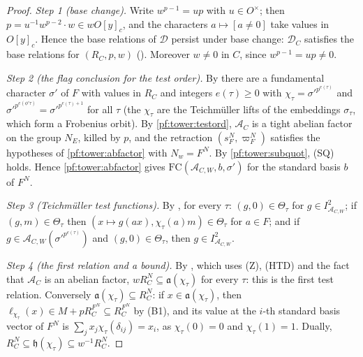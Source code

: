 \begin{proof}
\emph{Step 1 (base change).} Write $w^{p-1}=up$ with $u\in O^\times$; then $p=u^{-1}w^{p-2}\cdot w\in wO[y]_c$, and the
characters $a\mapsto[a\ne0]$ take values in $O[y]_c$. Hence the base relations of $\mathcal D$ persist under base change:
$\mathcal D_C$ satisfies the base relations for $(R_C,p,w)$
(). Moreover $w\ne0$ in $C$, since $w^{p-1}=up\ne0$.

\emph{Step 2 (the flag conclusion for the test order).} By
 there are a fundamental character $\sigma'$ of $F$ with values in
$R_C$ and integers $e(\tau)\ge0$ with $\chi_\tau=\sigma'^{p^{e(\tau)}}$ and $\sigma'^{p^{e(\phi'\tau)}}=\sigma'^{p^{e(\tau)+1}}$
for all $\tau$ (the $\chi_\tau$ are the Teichm\"uller lifts of the embeddings $\sigma_\tau$, which form a Frobenius orbit). By
\cref{pf:tower:testord}, $\mathcal A_C$ is a tight abelian factor on the group $N_E$, killed by $p$, and the retraction
$(s_F^N,\varpi_F^N)$ satisfies the hypotheses of \cref{pf:tower:abfactor} with $N_w=F^N$. By \cref{pf:tower:subquot}, (SQ)
holds. Hence \cref{pf:tower:abfactor} gives $\mathrm{FC}(\mathcal A_{C,W},b,\sigma')$ for the standard basis $b$ of $F^N$.

\emph{Step 3 (Teichm\"uller test functions).} By
, for every $\tau$: $(g,0)\in\Theta_\tau$
for $g\in I^2_{\mathcal A_{C,W}}$; if $(g,m)\in\Theta_\tau$ then $(x\mapsto g(ax),\chi_\tau(a)m)\in\Theta_\tau$ for $a\in F$; and
if $g\in\mathcal A_{C,W}(\sigma'^{p^{e(\tau)}})$ and $(g,0)\in\Theta_\tau$, then $g\in I^2_{\mathcal A_{C,W}}$.

\emph{Step 4 (the first relation and a bound).} By , which uses (Z),
(HTD) and the fact that $\mathcal A_C$ is an abelian factor, $wR_C^N\subseteq\mathfrak a(\chi_\tau)$ for every $\tau$: this is the
first test relation. Conversely $\mathfrak a(\chi_\tau)\subseteq R_C^N$: if $x\in\mathfrak a(\chi_\tau)$, then
$\ell_{\chi_\tau}(x)\in M+pR_C^{F^N}\subseteq R_C^{F^N}$ by (B1), and its value at the $i$-th standard basis vector of $F^N$ is
$\sum_jx_j\chi_\tau(\delta_{ij})=x_i$, as $\chi_\tau(0)=0$ and $\chi_\tau(1)=1$. Dually, $R_C^N\subseteq\mathfrak h(\chi_\tau)\subseteq
w^{-1}R_C^N$.


\end{proof}
